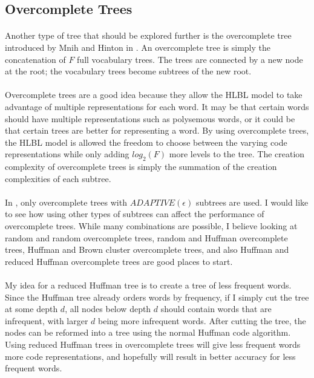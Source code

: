 \subsection{Overcomplete Trees}
\paragraph{}
Another type of tree that should be explored further is the overcomplete tree introduced by Mnih and Hinton in \cite{MnihHinton2009}. An overcomplete tree is simply the concatenation of $F$ full vocabulary trees. The trees are connected by a new node at the root; the vocabulary trees become subtrees of the new root. 
\paragraph{}
Overcomplete trees are a good idea because they allow the HLBL model to take advantage of multiple representations for each word. It may be that certain words should have multiple representations such as polysemous words, or it could be that certain trees are better for representing a word. By using overcomplete trees, the HLBL model is allowed the freedom to choose between the varying code representations while only adding $log_2(F)$ more levels to the tree. The creation complexity of overcomplete trees is simply the summation of the creation complexities of each subtree.
\paragraph{}
In \cite{MnihHinton2009}, only overcomplete trees with $ADAPTIVE(\epsilon)$ subtrees are used. I would like to see how using other types of subtrees can affect the performance of overcomplete trees. While many combinations are possible, I believe looking at random and random overcomplete trees, random and Huffman overcomplete trees, Huffman and Brown cluster overcomplete trees, and also Huffman and reduced Huffman overcomplete trees are good places to start.
\paragraph{}
My idea for a reduced Huffman tree is to create a tree of less frequent words. Since the Huffman tree already orders words by frequency, if I simply cut the tree at some depth $d$, all nodes below depth $d$ should contain words that are infrequent, with larger $d$ being more infrequent words. After cutting the tree, the nodes can be reformed into a tree using the normal Huffman code algorithm. Using reduced Huffman trees in overcomplete trees will give less frequent words more code representations, and hopefully will result in better accuracy for less frequent words.

